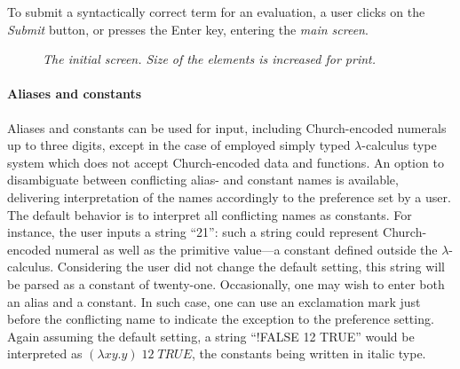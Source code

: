 \documentclass[table, a4paper, 10pt]{book}
\begin{document}
To submit a syntactically correct term for an evaluation, a user clicks on the \textit{Submit} button,
or presses the Enter key, entering the \textit{main screen}.

\begin{center}
\begin{figure}[H]\centering
\setlength{\fboxsep}{0pt}%
\setlength{\fboxrule}{0.1pt}
\caption{\textit{The initial screen. Size of the elements is increased for print.}}\label{initscr}
\end{figure}
\end{center}

\noindent

\paragraph{Aliases and constants}
Aliases and constants can be used for input, including Church-encoded numerals up to three digits,
except in the case of employed simply typed $\lambda$-calculus type system which does not
accept Church-encoded data and functions.
An option to disambiguate between conflicting alias- and constant names is available,
delivering interpretation of the names accordingly to the preference set by a user. The default behavior is
to interpret all conflicting names as constants. For instance, the user inputs
a string ``21'': such a string could represent Church-encoded numeral as well as the primitive
value---a constant defined outside the $\lambda$-calculus. Considering the user did not change the default
setting, this string will be parsed as a constant of twenty-one. Occasionally, one may wish
to enter both an alias and a constant. In such case, one can use an exclamation mark
just before the conflicting name to indicate the exception to the preference setting.
Again assuming the default setting, a string ``!FALSE 12 TRUE'' would be interpreted as
$(\lambda xy.y)\;\textit{12}\;\textit{TRUE}$, the constants being written in italic type.
\end{document}
